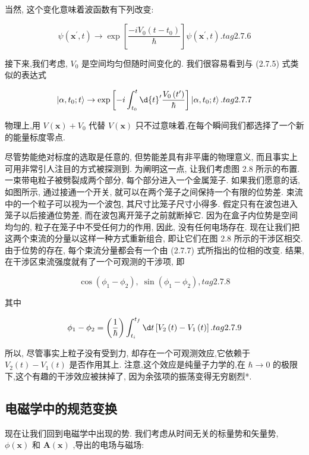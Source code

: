 \documentclass[lang=cn,newtx,10pt,scheme=chinese,thmcnt=section]{elegantbook}
\begin{document}
当然, 这个变化意味着波函数有下列改变:

$$
\psi \left( {{\mathbf{x}}^{\prime }, t}\right) \rightarrow \exp \left\lbrack \frac{-i{V}_{0}\left( {t - {t}_{0}}\right) }{\hbar }\right\rbrack \psi \left( {{\mathbf{x}}^{\prime }, t}\right) . tag{2.7.6}
$$


接下来,我们考虑, ${V}_{0}$ 是空间均匀但随时间变化的. 我们很容易看到与 (2.7.5) 式类似的表达式

$$
\left| {\alpha ,{t}_{0};t}\right\rangle \rightarrow \exp \left\lbrack {-i\int_{{t}_{0}}^{t}\d{t}^{\prime }\frac{{V}_{0}\left( {t}^{\prime }\right) }{\hbar }}\right\rbrack \left| {\alpha ,{t}_{0};t}\right\rangle . tag{2.7.7}
$$

物理上,用 $V\left( \mathbf{x}\right) + {V}_{0}$ 代替 $V\left( \mathbf{x}\right)$ 只不过意味着,在每个瞬间我们都选择了一个新的能量标度零点.

尽管势能绝对标度的选取是任意的, 但势能差具有非平庸的物理意义, 而且事实上可用非常引人注目的方式被探测到. 为阐明这一点, 让我们考虑图 2.8 所示的布置. 一束带电粒子被劈裂成两个部分, 每个部分进入一个金属笼子. 如果我们愿意的话, 如图所示, 通过接通一个开关, 就可以在两个笼子之间保持一个有限的位势差. 束流中的一个粒子可以视为一个波包, 其尺寸比笼子尺寸小得多. 假定只有在波包进入笼子以后接通位势差, 而在波包离开笼子之前就断掉它. 因为在盒子内位势是空间均匀的, 粒子在笼子中不受任何力的作用, 因此, 没有任何电场存在. 现在让我们把这两个束流的分量以这样一种方式重新组合, 即让它们在图 2.8 所示的干涉区相交. 由于位势的存在, 每个束流分量都会有一个由 (2.7.7) 式所指出的位相的改变. 结果, 在干涉区束流强度就有了一个可观测的干涉项, 即

$$
\cos \left( {{\phi }_{1} - {\phi }_{2}}\right) ,\;\sin \left( {{\phi }_{1} - {\phi }_{2}}\right) , tag{2.7.8}
$$


其中

$$
{\phi }_{1} - {\phi }_{2} = \left( \frac{1}{\hbar }\right) \int_{{t}_{i}}^{{t}_{f}}{\d t}\left\lbrack {{V}_{2}\left( t\right) - {V}_{1}\left( t\right) }\right\rbrack . tag{2. 7.9}
$$

所以, 尽管事实上粒子没有受到力, 却存在一个可观测效应,它依赖于 ${V}_{2}\left( t\right) - {V}_{1}\left( t\right)$ 是否作用其上. 注意,这个效应是纯量子力学的,在 $\hbar \rightarrow 0$ 的极限下,这个有趣的干涉效应被抹掉了, 因为余弦项的振荡变得无穷剧烈*.

\subsection*{电磁学中的规范变换}
现在让我们回到电磁学中出现的势. 我们考虑从时间无关的标量势和矢量势, $\phi \left( \mathbf{x}\right)$ 和 $\mathbf{A}\left( \mathbf{x}\right)$ ,导出的电场与磁场:
\end{document}
